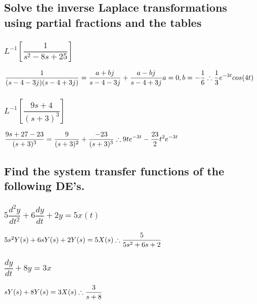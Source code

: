 \documentclass[12pt,a4paper]{article}
\begin{document}
\subsection{Solve the inverse Laplace transformations using partial fractions and the tables}
\subsubsection{$L^{-1}[\dfrac{1}{s^2-8s+25}]$}
$\displaystyle \frac{1}{(s-4-3j)(s-4+3j)}=
\frac{a+bj}{s-4-3j}+\frac{a-bj}{s-4+3j}\\
 a=0, b=-\frac{1}{6}\\
 \therefore \frac{1}{3}e^{-3t}cos(4t)$
\subsubsection{$L^{-1}[\dfrac{9s+4}{(s+3)^3}]$}
$\displaystyle \dfrac{9s+27-23}{(s+3)^3}=
\frac{9}{(s+3)^2}+\frac{-23}{(s+3)^3}\\
\therefore 9te^{-3t}-\frac{23}{2}t^2e^{-3t}$
\subsection{Find the system transfer functions of the following DE's.}
\subsubsection{$5\dfrac{d^2y}{dt^2}+6\dfrac{dy}{dt}+2y=5x(t)$}
$5s^2Y(s)+6sY(s) + 2Y(s) = 5X(s)\\
\therefore \dfrac{5}{5s^2+6s+2}$
\subsubsection{$\dfrac{dy}{dt}+8y=3x$}
$sY(s) + 8Y(s) = 3X(s)\\
\therefore \dfrac{3}{s+8}$
\end{document}
